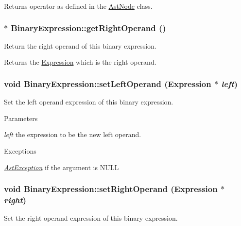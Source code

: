 \begin{DoxyReturn}{Returns}
operator as defined in the \hyperlink{classAstNode}{AstNode} class. 
\end{DoxyReturn}
\hypertarget{classBinaryExpression_a49ee8f4a0fbed5656fbd0c37446e8f82}{
\subsubsection[{getRightOperand}]{$\ast$ BinaryExpression::getRightOperand ()}}
\label{classBinaryExpression_a49ee8f4a0fbed5656fbd0c37446e8f82}
Return the right operand of this binary expression.

\begin{DoxyReturn}{Returns}
the \hyperlink{classExpression}{Expression} which is the right operand. 
\end{DoxyReturn}
\hypertarget{classBinaryExpression_a2bf7fd38f96a775a988bfb6b7838d9bf}{
\subsubsection[{setLeftOperand}]{\setlength{\rightskip}{0pt plus 5cm}void BinaryExpression::setLeftOperand ({\bf Expression} $\ast$ {\em left})}}
\label{classBinaryExpression_a2bf7fd38f96a775a988bfb6b7838d9bf}
Set the left operand expression of this binary expression.


\begin{DoxyParams}{Parameters}
\item[{\em left}]the expression to be the new left operand. \end{DoxyParams}

\begin{DoxyExceptions}{Exceptions}
\item[{\em \hyperlink{classAstException}{AstException}}]if the argument is NULL \end{DoxyExceptions}
\hypertarget{classBinaryExpression_a78f08f420bbba62af7fc8693bde2fb76}{
\subsubsection[{setRightOperand}]{\setlength{\rightskip}{0pt plus 5cm}void BinaryExpression::setRightOperand ({\bf Expression} $\ast$ {\em right})}}
\label{classBinaryExpression_a78f08f420bbba62af7fc8693bde2fb76}
Set the right operand expression of this binary expression.


